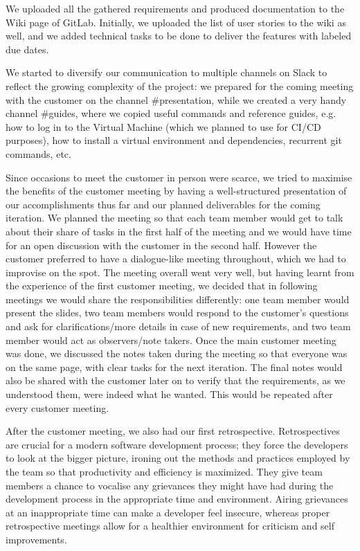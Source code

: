 \documentclass{l3proj}
\begin{document}
We uploaded all the gathered requirements and produced documentation to the Wiki page of GitLab. Initially, we uploaded the list of user stories to the wiki as well, and we added technical tasks to be done to deliver the features with labeled due dates.

We started to diversify our communication to multiple channels on Slack to reflect the growing complexity of the project: we prepared for the coming meeting with the customer on the channel \#presentation, while we created a very handy channel \#guides, where we copied useful commands and reference guides, e.g. how to log in to the Virtual Machine (which we planned to use for CI/CD purposes), how to install a virtual environment and dependencies, recurrent git commands, etc.

Since occasions to meet the customer in person were scarce, we tried to maximise the benefits of the customer meeting by having a well-structured presentation of our accomplishments thus far and our planned deliverables for the coming iteration. We planned the meeting so that each team member would get to talk about their share of tasks in the first half of the meeting and we would have time for an open discussion with the customer in the second half. However the customer preferred to have a dialogue-like meeting throughout, which we had to improvise on the spot. The meeting overall went very well, but having learnt from the experience of the first customer meeting, we decided that in following meetings we would share the responsibilities differently: one team member would present the slides, two team members would respond to the customer’s questions and ask for clarifications/more details in case of new requirements, and two team member would act as observers/note takers. Once the main customer meeting was done, we discussed the notes taken during the meeting so that everyone was on the same page, with clear tasks for the next iteration. The final notes would also be shared with the customer later on to verify that the requirements, as we understood them, were indeed what he wanted. This would be repeated after every customer meeting.

After the customer meeting, we also had our first retrospective. Retrospectives are crucial for a modern software development process; they force the developers to look at the bigger picture, ironing out the methods and practices employed by the team so that productivity and efficiency is maximized. They give team members a chance to vocalise any grievances they might have had during the development process in the appropriate time and environment. Airing grievances at an inappropriate time can make a developer feel insecure, whereas proper retrospective meetings allow for a healthier environment for criticism and self improvements. \cite{DerbyLarsenSchwaber} 
\end{document}
